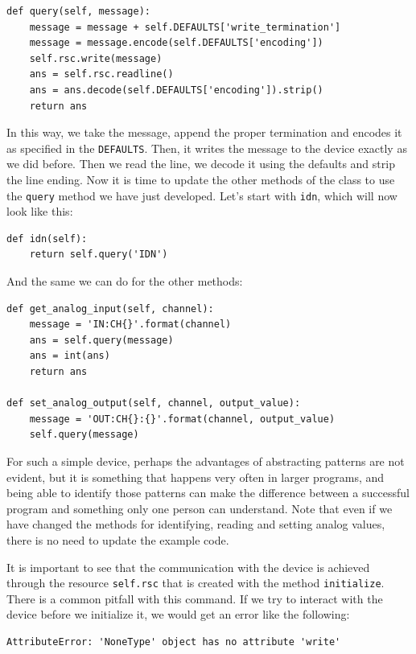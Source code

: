 \begin{verbatim}
def query(self, message):
    message = message + self.DEFAULTS['write_termination']
    message = message.encode(self.DEFAULTS['encoding'])
    self.rsc.write(message)
    ans = self.rsc.readline()
    ans = ans.decode(self.DEFAULTS['encoding']).strip()
    return ans
\end{verbatim}

In this way, we take the message, append the proper termination and encodes it as specified in the \texttt{DEFAULTS}. Then, it writes the message to the
device exactly as we did before. Then we read the line, we decode it using the defaults and strip the line ending. Now it is time to update the other methods of the class to use the \texttt{query} method we have just developed. Let's start with \texttt{idn}, which will now look like this:

\begin{verbatim}
def idn(self):
    return self.query('IDN')
\end{verbatim}

And the same we can do for the other methods:

\begin{verbatim}
def get_analog_input(self, channel):
    message = 'IN:CH{}'.format(channel)
    ans = self.query(message)
    ans = int(ans)
    return ans
    
def set_analog_output(self, channel, output_value):
    message = 'OUT:CH{}:{}'.format(channel, output_value)
    self.query(message)    
\end{verbatim}

For such a simple device, perhaps the advantages of abstracting patterns are not evident, but it is something that happens very often in larger programs, and being able to identify those patterns can make the difference between a successful program and something only one person can understand. Note that even if we have changed the methods for identifying, reading and setting analog values, there is no need to update the example code. 

It is important to see that the communication with the device is achieved through the resource \texttt{self.rsc} that is created with the method \texttt{initialize}. There is a common pitfall with this command. If we try to interact with the device before we initialize it, we would get an error like the following:

\begin{verbatim}
AttributeError: 'NoneType' object has no attribute 'write'
\end{verbatim}

